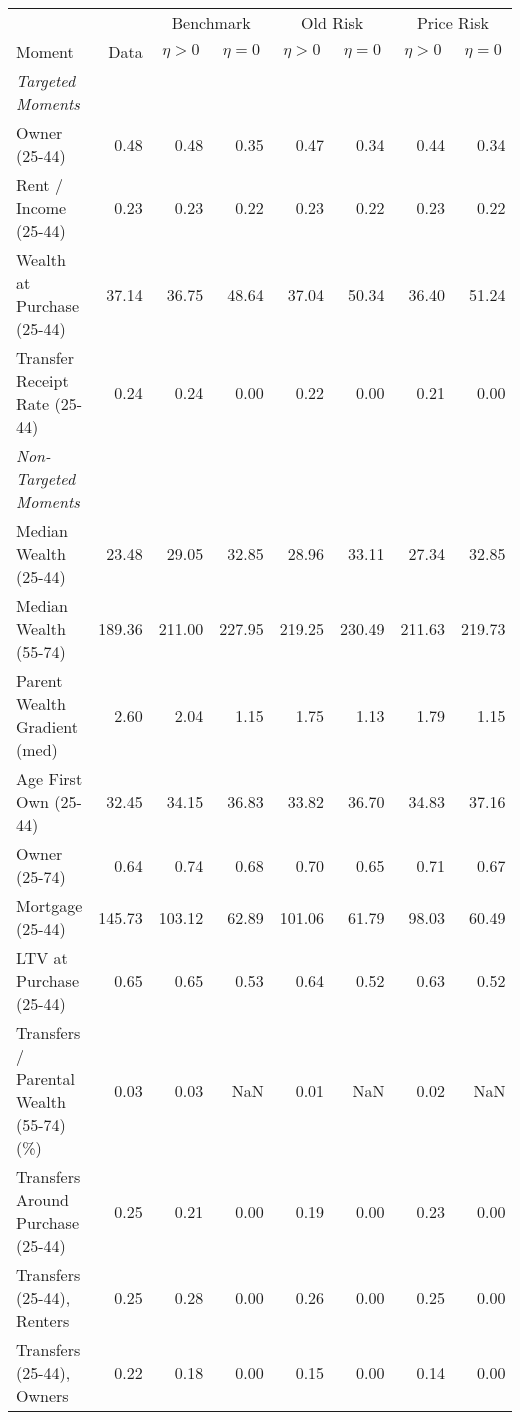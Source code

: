 \begin{tabular}{lr rr rr rr}
 \toprule & & \multicolumn{2}{c}{Benchmark} & \multicolumn{2}{c}{Old Risk} & \multicolumn{2}{c}{Price Risk}
 \\  \cmidrule(lr){3-4}\cmidrule(lr){5-6}\cmidrule(lr){7-8}
Moment & Data & \multicolumn{1}{c}{$ \eta>0 $} & \multicolumn{1}{c}{$ \eta=0 $} & \multicolumn{1}{c}{$ \eta>0 $} & \multicolumn{1}{c}{$ \eta=0 $} & \multicolumn{1}{c}{$ \eta>0 $} & \multicolumn{1}{c}{$ \eta=0 $}\\
\midrule
\textit{Targeted Moments} &  &  &  &  &  &  & \\
\;Owner (25-44) & 0.48 & 0.48 & 0.35 & 0.47 & 0.34 & 0.44 & 0.34\\
\;Rent / Income (25-44) & 0.23 & 0.23 & 0.22 & 0.23 & 0.22 & 0.23 & 0.22\\
\;Wealth at Purchase (25-44) & 37.14 & 36.75 & 48.64 & 37.04 & 50.34 & 36.40 & 51.24\\
\;Transfer Receipt Rate (25-44) & 0.24 & 0.24 & 0.00 & 0.22 & 0.00 & 0.21 & 0.00\\
\textit{Non-Targeted Moments} &  &  &  &  &  &  & \\
\;Median Wealth (25-44) & 23.48 & 29.05 & 32.85 & 28.96 & 33.11 & 27.34 & 32.85\\
\;Median Wealth (55-74) & 189.36 & 211.00 & 227.95 & 219.25 & 230.49 & 211.63 & 219.73\\
\;Parent Wealth Gradient (med) & 2.60 & 2.04 & 1.15 & 1.75 & 1.13 & 1.79 & 1.15\\
\;Age First Own (25-44) & 32.45 & 34.15 & 36.83 & 33.82 & 36.70 & 34.83 & 37.16\\
\;Owner (25-74) & 0.64 & 0.74 & 0.68 & 0.70 & 0.65 & 0.71 & 0.67\\
\;Mortgage (25-44) & 145.73 & 103.12 & 62.89 & 101.06 & 61.79 & 98.03 & 60.49\\
\;LTV at Purchase (25-44) & 0.65 & 0.65 & 0.53 & 0.64 & 0.52 & 0.63 & 0.52\\
\;Transfers / Parental Wealth (55-74) (\%) & 0.03 & 0.03 & NaN & 0.01 & NaN & 0.02 & NaN\\
\;Transfers Around Purchase (25-44) & 0.25 & 0.21 & 0.00 & 0.19 & 0.00 & 0.23 & 0.00\\
\;Transfers (25-44), Renters & 0.25 & 0.28 & 0.00 & 0.26 & 0.00 & 0.25 & 0.00\\
\;Transfers (25-44), Owners & 0.22 & 0.18 & 0.00 & 0.15 & 0.00 & 0.14 & 0.00\\
\bottomrule
\end{tabular}
